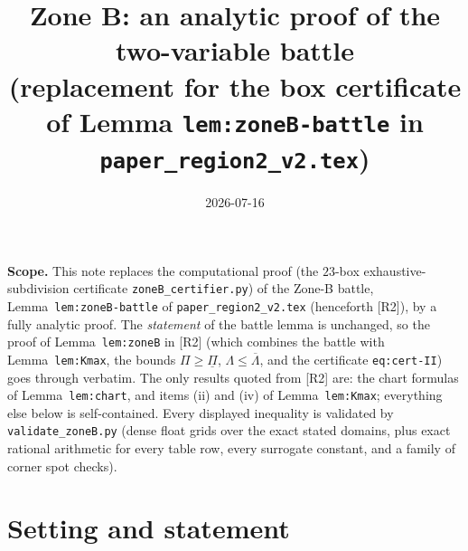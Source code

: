 \documentclass[11pt]{article}
\title{Zone B: an analytic proof of the two-variable battle\\
{\large (replacement for the box certificate of Lemma \texttt{lem:zoneB-battle}
in \texttt{paper\_region2\_v2.tex})}}
\author{}
\date{2026-07-16}
\theoremstyle{remark}
\newcommand{\RII}{[R2]}
\begin{document}
\maketitle

\noindent
\textbf{Scope.}  This note replaces the computational proof (the
$23$-box exhaustive-subdivision certificate \texttt{zoneB\_certifier.py})
of the Zone-B battle, Lemma~\texttt{lem:zoneB-battle} of
\texttt{paper\_region2\_v2.tex} (henceforth \RII), by a fully analytic
proof.  The \emph{statement} of the battle lemma is unchanged, so the proof
of Lemma~\texttt{lem:zoneB} in \RII{} (which combines the battle with
Lemma~\texttt{lem:Kmax}, the bounds
$\Pi\ge\underline\Pi$, $\Lambda\le\overline\Lambda$, and the certificate
\texttt{eq:cert-II}) goes through verbatim.  The only results quoted from
\RII{} are: the chart formulas of Lemma~\texttt{lem:chart}, and items (ii)
and (iv) of Lemma~\texttt{lem:Kmax}; everything else below is
self-contained.  Every displayed inequality is validated by
\texttt{validate\_zoneB.py} (dense float grids over the exact stated
domains, plus exact rational arithmetic for every table row, every
surrogate constant, and a family of corner spot checks).

\section{Setting and statement}
\end{document}
